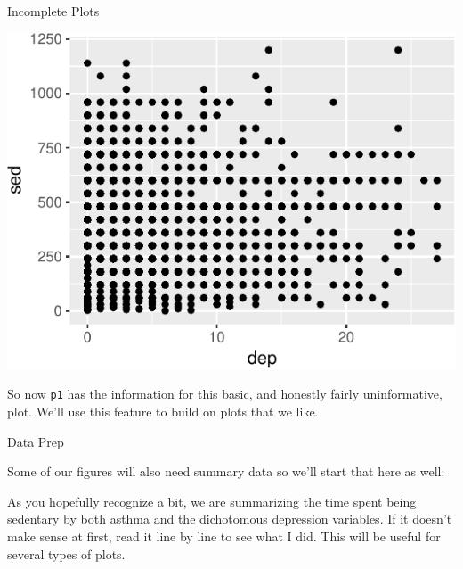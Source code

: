 \begin{frame}[fragile]{Incomplete Plots}

\includegraphics{09_AdvancedPlotting_files/figure-beamer/c1-1.pdf}

So now \texttt{p1} has the information for this basic, and honestly
fairly uninformative, plot. We'll use this feature to build on plots
that we like.

\end{frame}

\begin{frame}[fragile]{Data Prep}

Some of our figures will also need summary data so we'll start that here
as well:

\begin{Shaded}
\end{Shaded}

As you hopefully recognize a bit, we are summarizing the time spent
being sedentary by both asthma and the dichotomous depression variables.
If it doesn't make sense at first, read it line by line to see what I
did. This will be useful for several types of plots.

\end{frame}

